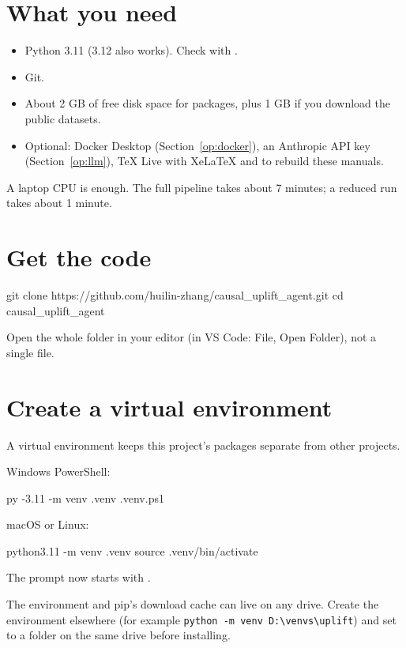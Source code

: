 \documentclass[11pt]{article}
\begin{document}
\section{What you need}
\begin{itemize}
\item Python 3.11 (3.12 also works). Check with .
\item Git.
\item About 2 GB of free disk space for packages, plus 1 GB if you download the public datasets.
\item Optional: Docker Desktop (Section~\ref{op:docker}), an Anthropic API key (Section~\ref{op:llm}), TeX Live with XeLaTeX and  to rebuild these manuals.
\end{itemize}

A laptop CPU is enough. The full pipeline takes about 7 minutes; a reduced run takes about 1 minute.

\section{Get the code}
\begin{shell}
git clone https://github.com/huilin-zhang/causal_uplift_agent.git
cd causal_uplift_agent
\end{shell}
Open the whole folder in your editor (in VS Code: File, Open Folder), not a single file.

\section{Create a virtual environment}
A virtual environment keeps this project's packages separate from other projects.

Windows PowerShell:
\begin{shell}
py -3.11 -m venv .venv
.venv\Scripts\Activate.ps1
\end{shell}
macOS or Linux:
\begin{shell}
python3.11 -m venv .venv
source .venv/bin/activate
\end{shell}
The prompt now starts with .

\begin{note}
The environment and pip's download cache can live on any drive. Create the environment elsewhere (for example \texttt{python -m venv D:\textbackslash venvs\textbackslash uplift}) and set  to a folder on the same drive before installing.
\end{note}
\end{document}
